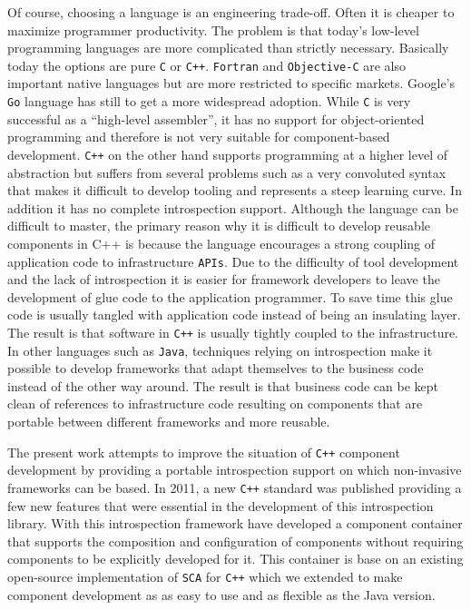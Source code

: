 Of course, choosing a language is an engineering trade-off. Often it is cheaper to maximize programmer
productivity. The problem is that today's low-level programming languages are more complicated than
strictly necessary. Basically today the options are pure \texttt{C} or \texttt{C++}. \texttt{Fortran}
and \texttt{Objective-C} are also important native languages but are more restricted to specific markets.
Google's \texttt{Go} language has still to get a more widespread adoption. While \texttt{C} is very
successful as a ``high-level assembler'', it has no support for object-oriented programming and therefore
is not very suitable for component-based development. \texttt{C++} on the other hand supports programming
at a higher level of abstraction but suffers from several problems such as a very convoluted syntax that
makes it difficult to develop tooling and represents a steep learning curve. In addition it has no complete
introspection support. Although the language can be difficult to master, the primary reason why it is difficult
to develop reusable components in C++ is because the language encourages a strong coupling of application code
to infrastructure \texttt{APIs}. Due to the difficulty of tool development and the lack of introspection
it is easier for framework developers to leave the development of glue code to the application
programmer. To save time this glue code is usually tangled with application code instead of being an insulating
layer. The result is that software in \texttt{C++} is usually tightly coupled to the infrastructure. In other languages
such as \texttt{Java}, techniques relying on introspection make it possible to develop frameworks that adapt
themselves to the business code instead of the other way around. The result is that business code can be kept
clean of references to infrastructure code resulting on components that are portable between different frameworks and more reusable.

The present work attempts to improve the situation of \texttt{C++} component development by providing a portable
introspection support on which non-invasive frameworks can be based. In 2011, a new \texttt{C++} standard was published
\cite{CPP11} providing a few new features that were essential in the development of this introspection library.
With this introspection framework have developed a component container that supports the composition and configuration
of components without requiring components to be explicitly developed for it. This container is base on an existing
open-source implementation of \texttt{SCA} for \texttt{C++} which we extended to make component development as as easy to use and as
flexible as the Java version.

